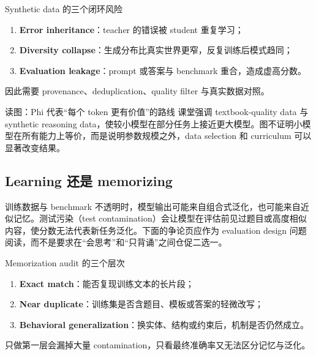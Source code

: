 
\begin{warningbox}{Synthetic data 的三个闭环风险}
\begin{enumerate}
  \item \textbf{Error inheritance}：teacher 的错误被 student 重复学习；
  \item \textbf{Diversity collapse}：生成分布比真实世界更窄，反复训练后模式趋同；
  \item \textbf{Evaluation leakage}：prompt 或答案与 benchmark 重合，造成虚高分数。
\end{enumerate}
因此需要 provenance、deduplication、quality filter 与真实数据对照。
\end{warningbox}



\begin{knowledgebox}{读图：Phi 代表“每个 token 更有价值”的路线}
课堂强调 textbook-quality data 与 synthetic reasoning data，使较小模型在部分任务上接近更大模型。图不证明小模型在所有能力上等价，而是说明参数规模之外，data selection 和 curriculum 可以显著改变结果。
\end{knowledgebox}

\subsection{Learning 还是 memorizing}

训练数据与 benchmark 不透明时，模型输出可能来自组合式泛化，也可能来自近似记忆。测试污染（test contamination）会让模型在评估前见过题目或高度相似内容，使分数无法代表新任务泛化。下面的争论页应作为 evaluation design 问题阅读，而不是要求在“会思考”和“只背诵”之间仓促二选一。


\begin{importantbox}{Memorization audit 的三个层次}
\begin{enumerate}
  \item \textbf{Exact match}：能否复现训练文本的长片段；
  \item \textbf{Near duplicate}：训练集是否含题目、模板或答案的轻微改写；
  \item \textbf{Behavioral generalization}：换实体、结构或约束后，机制是否仍然成立。
\end{enumerate}
只做第一层会漏掉大量 contamination，只看最终准确率又无法区分记忆与泛化。
\end{importantbox}


